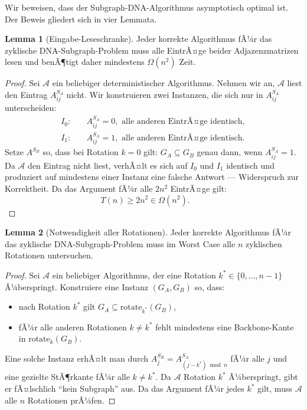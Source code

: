 ﻿\documentclass[a4paper,12pt]{article}
\theoremstyle{definition}
\newtheorem{lemma}{Lemma}
\begin{document}
Wir beweisen, dass der Subgraph-DNA-Algorithmus asymptotisch optimal ist.
Der Beweis gliedert sich in vier Lemmata.

\begin{lemma}[Eingabe-Leseschranke]
    \label{lem:eingabe}
    Jeder korrekte Algorithmus fÃ¼r das zyklische DNA-Subgraph-Problem muss alle
    EintrÃ¤ge beider Adjazenzmatrizen lesen und benÃ¶tigt daher mindestens
    $\Omega(n^2)$ Zeit.
\end{lemma}

\begin{proof}
    Sei $\mathcal{A}$ ein beliebiger deterministischer Algorithmus.
    Nehmen wir an, $\mathcal{A}$ liest den Eintrag $A^{S_A}_{ij}$ nicht.
    Wir konstruieren zwei Instanzen, die sich nur in $A^{S_A}_{ij}$ unterscheiden:
    \begin{align*}
        I_0: & \quad A^{S_A}_{ij} = 0, \text{ alle anderen EintrÃ¤ge identisch}, \\
        I_1: & \quad A^{S_A}_{ij} = 1, \text{ alle anderen EintrÃ¤ge identisch}.
    \end{align*}
    Setze $A^{S_B}$ so, dass bei Rotation $k = 0$ gilt:
    $G_A \subseteq G_B$ genau dann, wenn $A^{S_A}_{ij} = 1$.
    Da $\mathcal{A}$ den Eintrag nicht liest, verhÃ¤lt es sich auf $I_0$ und $I_1$
    identisch und produziert auf mindestens einer Instanz eine falsche Antwort ---
    Widerspruch zur Korrektheit. Da das Argument fÃ¼r alle $2n^2$ EintrÃ¤ge gilt:
    \[
        T(n) \geq 2n^2 \in \Omega(n^2). \qquad 
    \]
\end{proof}

\begin{lemma}[Notwendigkeit aller Rotationen]
    \label{lem:rotationen}
    Jeder korrekte Algorithmus fÃ¼r das zyklische DNA-Subgraph-Problem muss im
    Worst Case alle $n$ zyklischen Rotationen untersuchen.
\end{lemma}

\begin{proof}
    Sei $\mathcal{A}$ ein beliebiger Algorithmus, der eine Rotation
    $k^* \in \{0, \ldots, n-1\}$ Ã¼berspringt.
    Konstruiere eine Instanz $(G_A, G_B)$ so, dass:
    \begin{itemize}
        \item nach Rotation $k^*$ gilt $G_A \subseteq \mathrm{rotate}_{k^*}(G_B)$,
        \item fÃ¼r alle anderen Rotationen $k \neq k^*$ fehlt mindestens eine
              Backbone-Kante in $\mathrm{rotate}_k(G_B)$.
    \end{itemize}
    Eine solche Instanz erhÃ¤lt man durch $A^{S_B}_j = A^{S_A}_{(j-k^*)\bmod n}$
    fÃ¼r alle $j$ und eine gezielte StÃ¶rkante fÃ¼r alle $k \neq k^*$.
    Da $\mathcal{A}$ Rotation $k^*$ Ã¼berspringt, gibt er fÃ¤lschlich
    ``kein Subgraph'' aus. Da das Argument fÃ¼r jedes $k^*$ gilt, muss
    $\mathcal{A}$ alle $n$ Rotationen prÃ¼fen. 
\end{proof}
\end{document}
